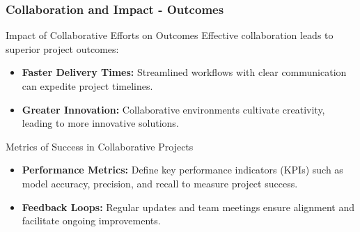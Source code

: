 \documentclass[aspectratio=169]{beamer}
\begin{document}
\begin{frame}[fragile]
    \frametitle{Collaboration and Impact - Outcomes}
    \begin{block}{Impact of Collaborative Efforts on Outcomes}
        Effective collaboration leads to superior project outcomes:
    \end{block}
    
    \begin{itemize}
        \item \textbf{Faster Delivery Times:} 
            Streamlined workflows with clear communication can expedite project timelines.
        \item \textbf{Greater Innovation:} 
            Collaborative environments cultivate creativity, leading to more innovative solutions.
    \end{itemize}
    
    \begin{block}{Metrics of Success in Collaborative Projects}
        \begin{itemize}
            \item \textbf{Performance Metrics:} Define key performance indicators (KPIs) such as model accuracy, precision, and recall to measure project success.
            \item \textbf{Feedback Loops:} 
                Regular updates and team meetings ensure alignment and facilitate ongoing improvements.
        \end{itemize}
    \end{block}
\end{frame}
\end{document}
